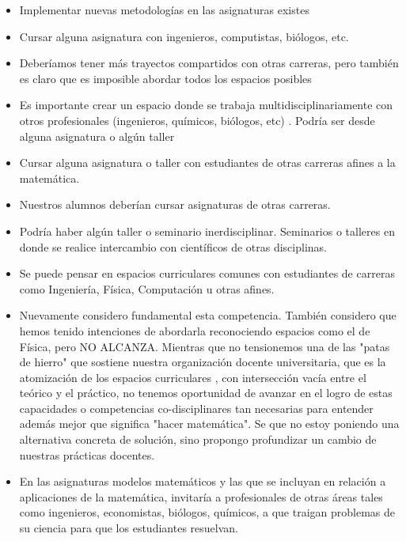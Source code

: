 \documentclass[a4paper,10pt,BCOR10mm,oneside,headsepline]{scrbook}
\begin{document}
\begin{subappendices}
\begin{itemize}
\item Implementar nuevas metodologías en las asignaturas existes

\item Cursar alguna asignatura con ingenieros, computistas, biólogos, etc.

\item Deberíamos tener más trayectos compartidos con otras carreras, pero también es claro que es imposible abordar todos los espacios posibles

\item Es importante crear un espacio donde se trabaja multidisciplinariamente con otros profesionales (ingenieros, químicos, biólogos, etc) . Podría ser desde alguna asignatura  o algún taller 

\item Cursar alguna asignatura o taller con estudiantes de otras carreras afines a la matemática.

\item Nuestros alumnos deberían cursar asignaturas de otras carreras.

\item Podría haber algún taller o seminario inerdisciplinar. 
Seminarios o talleres en donde se realice intercambio con científicos de otras disciplinas.

\item Se puede pensar en espacios curriculares comunes con estudiantes de carreras como Ingeniería, Física, Computación u otras afines. 

\item Nuevamente considero fundamental esta competencia. También considero que hemos tenido intenciones de abordarla reconociendo espacios como el de Física, pero NO ALCANZA.  Mientras que no tensionemos una de las "patas de hierro" que sostiene nuestra organización docente universitaria, que es la atomización de los espacios curriculares , con intersección vacía entre el teórico y el práctico, no tenemos oportunidad de avanzar en el logro de estas capacidades o competencias co-disciplinares tan necesarias para entender además mejor que significa "hacer matemática". Se que no estoy poniendo una alternativa concreta de solución, sino propongo profundizar  un cambio de nuestras prácticas docentes.

\item En las asignaturas modelos matemáticos y las que se incluyan en relación a aplicaciones de la matemática, invitaría a profesionales de otras áreas tales como ingenieros, economistas, biólogos, químicos,  a que traigan problemas de su ciencia para que los estudiantes resuelvan.  
\end{itemize}
 

\end{subappendices}
\end{document}

